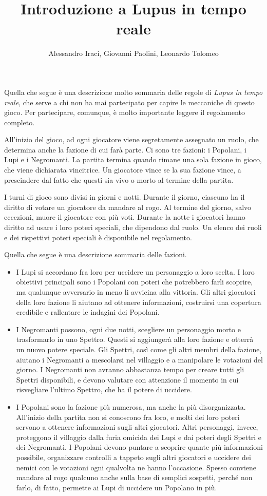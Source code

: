 \documentclass[a4paper,10pt]{article}
\title{Introduzione a Lupus in tempo reale}
\author{Alessandro Iraci, Giovanni Paolini, Leonardo Tolomeo}
\begin{document}
\maketitle

Quella che segue è una descrizione molto sommaria delle regole di \emph{Lupus in tempo reale}, che serve
a chi non ha mai partecipato per capire le meccaniche di questo gioco. Per partecipare, comunque, è molto
importante leggere il regolamento completo.

All'inizio del gioco, ad ogni giocatore viene segretamente assegnato un ruolo,
che determina anche la fazione di cui farà parte.
Ci sono tre fazioni: i Popolani, i Lupi e i Negromanti. La partita termina
quando rimane una sola fazione in gioco, che viene dichiarata vincitrice.
Un giocatore vince se la sua fazione vince, a prescindere dal fatto che
questi sia vivo o morto al termine della partita.

I turni di gioco sono divisi in giorni e notti. Durante il giorno, ciascuno
ha il diritto di votare un giocatore da mandare al rogo. 
Al termine del giorno, salvo eccezioni, muore il giocatore con più voti.
Durante la notte i giocatori hanno diritto ad usare i loro poteri
speciali, che dipendono dal ruolo. Un elenco dei ruoli e dei rispettivi
poteri speciali è disponibile nel regolamento.

Quella che segue è una descrizione sommaria delle fazioni.
\begin{itemize}
 \item I Lupi si accordano fra loro per uccidere un personaggio a loro scelta. 
    I loro obiettivi principali sono i Popolani con poteri che potrebbero farli scoprire,
    ma qualunque avversario in meno li avvicina alla vittoria.
    Gli altri giocatori della loro fazione li aiutano ad
    ottenere informazioni, costruirsi una copertura credibile e rallentare le indagini dei Popolani.
 \item I Negromanti possono, ogni due notti, scegliere un personaggio morto e trasformarlo in uno Spettro.
    Questi si aggiungerà alla loro fazione e otterrà un nuovo potere speciale.
    Gli Spettri, così come gli altri membri della fazione, aiutano i Negromanti a mescolarsi nel villaggio
    e a manipolare le votazioni del giorno.
    I Negromanti non avranno abbastanza tempo per creare tutti gli Spettri disponibili, e devono valutare
    con attenzione il momento in cui risvegliare l'ultimo Spettro, che ha il potere di uccidere.
 \item I Popolani sono la fazione più numerosa, ma anche la più disorganizzata. All'inizio della 
    partita non si conoscono fra loro, e molti dei loro poteri servono a ottenere informazioni sugli 
    altri giocatori. Altri personaggi, invece, proteggono il villaggio dalla furia omicida dei Lupi
    e dai poteri degli Spettri e dei Negromanti.
    I Popolani devono puntare a scoprire quante più informazioni possibile, organizzare
    controlli a tappeto sugli altri giocatori e uccidere dei nemici con le votazioni ogni
    qualvolta ne hanno l'occasione. Spesso conviene mandare al rogo qualcuno anche sulla base di
    semplici sospetti, perché non farlo, di fatto, permette ai Lupi di uccidere un Popolano
    in più.
\end{itemize}
\end{document}

